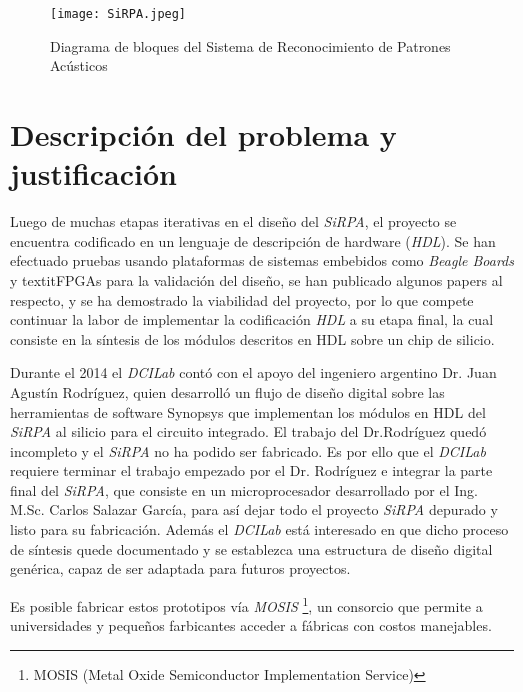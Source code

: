 \begin{figure}[h]
\texttt{[image: SiRPA.jpeg]}
\centering
\caption{Diagrama de bloques del Sistema de Reconocimiento de Patrones Acústicos}
\label{sirpa}
\end{figure}


\section{Descripción del problema y justificación}

Luego de muchas etapas iterativas en el diseño del \textit{SiRPA}, el proyecto se encuentra codificado en un lenguaje de descripción de hardware (\textit{HDL}). Se han efectuado pruebas usando plataformas de sistemas embebidos como \textit{Beagle Boards} y textit{FPGAs}  para la validación del diseño, se han publicado algunos papers al respecto, y se ha demostrado la viabilidad del proyecto, por lo que compete continuar la labor de
implementar la codificación \textit{HDL} a su etapa final, la cual consiste en la síntesis de los módulos descritos en HDL sobre un chip de silicio.

Durante el 2014 el \textit{DCILab} contó con el apoyo del ingeniero argentino Dr. Juan Agustín Rodríguez, quien desarrolló un flujo de diseño digital sobre las herramientas de software Synopsys que implementan los módulos en HDL del \textit{SiRPA} al silicio para el circuito integrado. El trabajo del Dr.Rodríguez quedó incompleto y el \textit{SiRPA} no ha podido ser fabricado. Es por ello que el \textit{DCILab} requiere terminar el trabajo empezado por el Dr. Rodríguez e integrar la parte final del \textit{SiRPA}, que consiste en un microprocesador desarrollado por el Ing. M.Sc. Carlos Salazar García, para así dejar todo el proyecto \textit{SiRPA} depurado y listo para su fabricación. Además el \textit{DCILab} está interesado en que dicho proceso de síntesis quede documentado y se establezca una estructura de diseño digital genérica, capaz de ser adaptada para futuros proyectos.


Es posible fabricar estos prototipos vía \textit{MOSIS} \footnote{MOSIS (Metal Oxide Semiconductor Implementation Service)}, un consorcio que permite a universidades y pequeños farbicantes acceder a fábricas con costos manejables. \cite{website:mosis}

